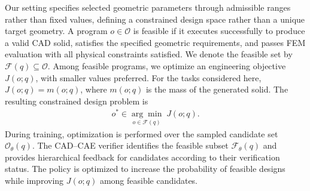 Our setting specifies selected geometric parameters through admissible ranges rather than fixed values, defining a constrained design space rather than a unique target geometry. A program \(o\in\mathcal{O}\) is feasible if it executes successfully to produce a valid CAD solid, satisfies the specified geometric requirements, and passes FEM evaluation with all physical constraints satisfied. We denote the feasible set by \(\mathcal{F}(q)\subseteq\mathcal{O}\). Among feasible programs, we optimize an engineering objective \(J(o;q)\), with smaller values preferred. For the tasks considered here, \(J(o;q)=m(o;q)\), where \(m(o;q)\) is the mass of the generated solid. The resulting constrained design problem is
\begin{align}
    o^{*}\in\underset{o\in\mathcal F(q)}{\arg\min}\;J(o;q).
    \label{eq:problem}
\end{align}
During training, optimization is performed over the sampled candidate set
\(\mathcal{O}_{\theta}(q)\). The CAD--CAE verifier identifies the feasible subset
\(\mathcal{F}_{\theta}(q)\) and provides hierarchical feedback for candidates
according to their verification status. The policy is optimized to increase the
probability of feasible designs while improving \(J(o;q)\) among feasible candidates.




